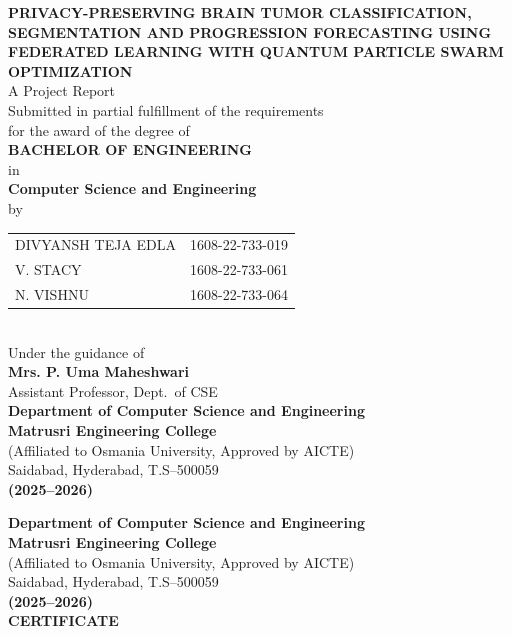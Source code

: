 \documentclass[12pt,a4paper,oneside]{report}
\newcommand{\projecttitle}{Privacy-Preserving Brain Tumor Classification, Segmentation and Progression Forecasting Using Federated Learning with Quantum Particle Swarm Optimization}
\newcommand{\guidename}{Mrs. P. Uma Maheshwari}
\newcommand{\guidetitle}{Assistant Professor}
\newcommand{\collegename}{Matrusri Engineering College}
\newcommand{\collegesub}{(Affiliated to Osmania University, Approved by AICTE)}
\newcommand{\collegeaddr}{Saidabad, Hyderabad, T.S--500059}
\newcommand{\deptname}{Department of Computer Science and Engineering}
\newcommand{\academicyear}{2025--2026}
\begin{document}


\begin{titlepage}
\begin{center}
\vspace*{1cm}
{\Large\bfseries\MakeUppercase{\projecttitle}}\\[2cm]

{\large A Project Report}\\[0.3cm]
Submitted in partial fulfillment of the requirements\\
for the award of the degree of\\[0.3cm]
{\large\bfseries BACHELOR OF ENGINEERING}\\[0.2cm]
in\\[0.2cm]
{\large\bfseries Computer Science and Engineering}\\[1.5cm]

by\\[0.5cm]
\begin{tabular}{ll}
DIVYANSH TEJA EDLA & 1608-22-733-019 \\
V. STACY           & 1608-22-733-061 \\
N. VISHNU          & 1608-22-733-064 \\
\end{tabular}\\[1.5cm]

Under the guidance of\\[0.3cm]
{\bfseries \guidename}\\
\guidetitle, Dept.\ of CSE\\[1.5cm]

{\bfseries \deptname}\\
{\large\bfseries \collegename}\\
\collegesub\\
\collegeaddr\\[0.3cm]
{\bfseries (\academicyear)}
\end{center}
\end{titlepage}

\newpage
\begin{center}
{\bfseries \deptname}\\
{\large\bfseries \collegename}\\
\collegesub\\
\collegeaddr\\
{\bfseries (\academicyear)}\\[1cm]
{\Large\bfseries CERTIFICATE}\\[1cm]
\end{center}
\end{document}
